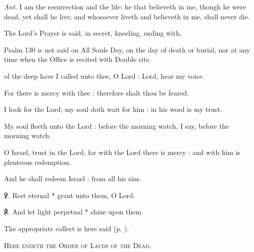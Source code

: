 \textit{Ant.} I am the resurrection and the life: he that believeth in me, though he were dead, yet shall he live; and whosoever liveth and believeth in me, shall never die.
\vspace{-3ex}
\begin{rubric}
The Lord's Prayer is said, in secret, kneeling, ending with,
\end{rubric}
\clearpage
{}
\begin{rubric}
{Psalm 130 is not said on All Souls Day, on the day of death or burial, nor at any time when the Office is recited with Double rite.}
\end{rubric}
 of the deep have I called unto thee, O Lord : Lord, hear my voice.\par
{}
For there is mercy with thee : therefore shalt thou be feared.\par
{}I look for the Lord; my soul doth wait for him : in his word is my trust.\par
{}My soul fleeth unto the Lord : before the morning watch, I say, before the morning watch.\par
{}O Israel, trust in the Lord, for with the Lord there is mercy : and with him is plenteous redemption.\par
{}And he shall redeem Israel : from all his sins.\par
℣. Rest eternal * grant unto them, O Lord.\par
℟. And let light perpetual * shine upon them.


\begin{rubric}
{The appropriate collect is here said (p. \pageref{dead}).}
\end{rubric}
\par
\begin{center}
    \textsc{Here endeth the Order of Lauds of the Dead.}
\end{center}